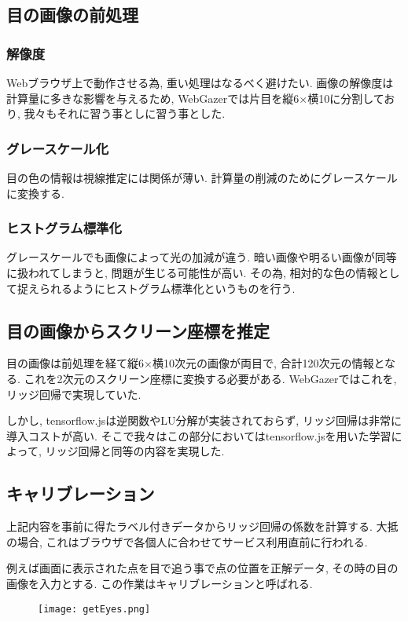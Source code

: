 \documentclass[a4paper,11pt]{jsarticle}
\begin{document}
\subsection{目の画像の前処理}
\subsubsection{解像度}
Webブラウザ上で動作させる為, 重い処理はなるべく避けたい. 
画像の解像度は計算量に多きな影響を与えるため, WebGazerでは片目を縦6×横10に分割しており, 我々もそれに習う事としに習う事とした.

\subsubsection{グレースケール化}
目の色の情報は視線推定には関係が薄い. 
計算量の削減のためにグレースケールに変換する.

\subsubsection{ヒストグラム標準化}
グレースケールでも画像によって光の加減が違う. 
暗い画像や明るい画像が同等に扱われてしまうと, 問題が生じる可能性が高い.
その為, 相対的な色の情報として捉えられるようにヒストグラム標準化というものを行う.

\subsection{目の画像からスクリーン座標を推定}
目の画像は前処理を経て縦6×横10次元の画像が両目で, 合計120次元の情報となる.
これを2次元のスクリーン座標に変換する必要がある.
WebGazerではこれを, リッジ回帰で実現していた.

しかし, tensorflow.jsは逆関数やLU分解が実装されておらず, リッジ回帰は非常に導入コストが高い.
そこで我々はこの部分においてはtensorflow.jsを用いた学習によって, リッジ回帰と同等の内容を実現した.

\subsection{キャリブレーション}
上記内容を事前に得たラベル付きデータからリッジ回帰の係数を計算する.
大抵の場合, これはブラウザで各個人に合わせてサービス利用直前に行われる.

例えば画面に表示された点を目で追う事で点の位置を正解データ, その時の目の画像を入力とする.
この作業はキャリブレーションと呼ばれる.

\begin{figure}
  \begin{center}
    \texttt{[image: getEyes.png]}
    \caption{}
    \label{fig:kakumaku}
  \end{center}
\end{figure}
\end{document}
